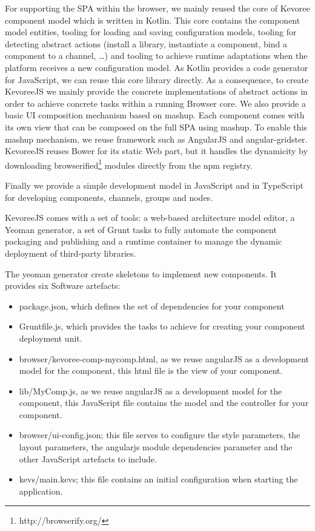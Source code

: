 For supporting the SPA within the browser, we mainly reused the core of Kevoree component model which is written in Kotlin. This core contains the component model entities, tooling for loading and saving configuration models, tooling for detecting abstract actions (install a library, instantiate a component, bind a component to a channel, \dots)  and tooling to achieve runtime adaptations when the platform receives a new configuration model. As Kotlin provides a code generator for JavaScript, we can reuse this core library directly. As a consequence, to create KevoreeJS we mainly provide the concrete implementations of abstract actions in order to achieve concrete tasks within a running Browser core. We also provide a basic UI composition mechanism based on mashup. Each component comes with its own view that can be composed on the full SPA using mashup. To enable this mashup mechanism, we reuse framework such as AngularJS and angular-gridster. KevoreeJS reuses Bower for its static Web part, but it handles the dynamicity by downloading browserified\footnote{http://browserify.org/} modules directly from the npm registry.




Finally we provide a simple development model in JavaScript and in TypeScript for developing components, channels, groups and nodes.

KevoreeJS comes with a set of tools: a web-based architecture model editor, a Yeoman generator, a set of Grunt tasks to fully automate the component packaging and publishing and a runtime container to manage the dynamic deployment of third-party libraries.



The yeoman generator create skeletons to implement new components. It provides six Software artefacts:
\begin{itemize}
	\item package.json, which defines the set of dependencies for your component
	\item Gruntfile.js, which provides the tasks to achieve for creating your component deployment unit. 
	\item  browser/kevoree-comp-mycomp.html, as we reuse angularJS as a development model for the component, this html file is the view of your component.
	\item lib/MyComp.js,  as we reuse angularJS as a development model for the component, this JavaScript file contains the model and the controller for your component.
	\item browser/ui-config.json; this file serves to configure the style parameters, the layout parameters, the angularjs module dependencies parameter and the other JavaScript artefacts to include. 
	\item kevs/main.kevs; this file contains an initial configuration when starting the application. 
\end{itemize}



